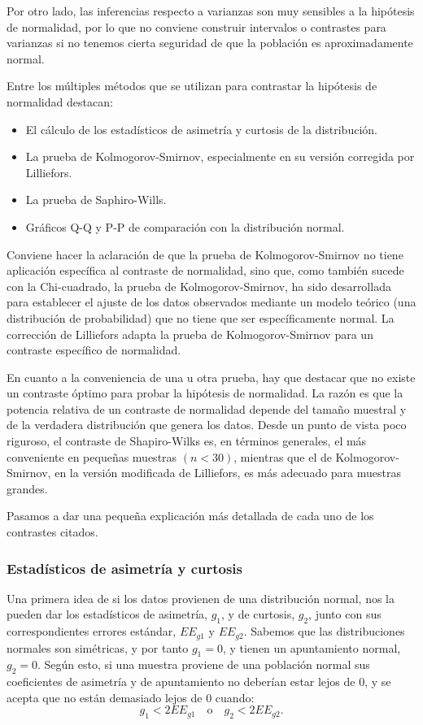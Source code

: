 Por otro lado, las inferencias respecto a varianzas son muy sensibles a la hipótesis de normalidad, por lo que no conviene construir
intervalos o contrastes para varianzas si no tenemos cierta seguridad de que la población es aproximadamente normal.

Entre los múltiples métodos que se utilizan para contrastar la hipótesis de normalidad destacan:
\begin{itemize}
\item El cálculo de los estadísticos de asimetría y curtosis de la distribución.
\item La prueba de Kolmogorov-Smirnov, especialmente en su versión corregida por Lilliefors.
\item La prueba de Saphiro-Wills.
\item Gráficos Q-Q y P-P de comparación con la distribución normal.
\end{itemize}

Conviene hacer la aclaración de que la prueba de Kolmogorov-Smirnov no tiene aplicación específica al contraste de normalidad, sino que,
como también sucede con la Chi-cuadrado, la prueba de Kolmogorov-Smirnov, ha sido desarrollada para establecer el ajuste de los datos
observados mediante un modelo teórico (una distribución de probabilidad) que no tiene que ser específicamente normal. La corrección de
Lilliefors adapta la prueba de Kolmogorov-Smirnov para un contraste específico de normalidad.

En cuanto a la conveniencia de una u otra prueba, hay que destacar que no existe un contraste óptimo para probar la hipótesis de normalidad.
La razón es que la potencia relativa de un contraste de normalidad depende del tamaño muestral y de la verdadera distribución que genera los
datos. Desde un punto de vista poco riguroso, el contraste de Shapiro-Wilks es, en términos generales, el más conveniente en pequeñas
muestras $(n<30)$, mientras que el de Kolmogorov-Smirnov, en la versión modificada de Lilliefors, es más adecuado para muestras grandes.

Pasamos a dar una pequeña explicación más detallada de cada uno de los contrastes citados.

\subsubsection{Estadísticos de asimetría y curtosis}
Una primera idea de si los datos provienen de una distribución normal, nos la pueden dar los estadísticos de asimetría, $g_1$, y de
curtosis, $g_2$, junto con sus correspondientes errores estándar, $EE_{g1}$ y $EE_{g2}$. Sabemos que las distribuciones normales son
simétricas, y por tanto $g_1=0$, y tienen un apuntamiento normal, $g_2=0$. Según esto, si una muestra proviene de una población normal sus
coeficientes de asimetría y de apuntamiento no deberían estar lejos de 0, y se acepta que no están demasiado lejos de 0 cuando:
\[
g_1<2EE_{g1}\quad \text{o}\quad g_2<2EE_{g2}.
\]

